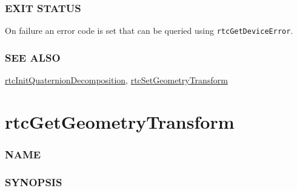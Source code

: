 \subsubsection{EXIT STATUS}\label{exit-status}

On failure an error code is set that can be queried using
\texttt{rtcGetDeviceError}.

\subsubsection{SEE ALSO}\label{see-also}

\hyperref[rtcinitquaterniondecomposition]{rtcInitQuaternionDecomposition},
\hyperref[rtcsetgeometrytransform]{rtcSetGeometryTransform}

\pagebreak

\section{rtcGetGeometryTransform}\label{rtcgetgeometrytransform}

\subsubsection{NAME}\label{name}

\begin{Shaded}
\begin{Highlighting}[]
\OperatorTok{{-}}
\end{Highlighting}
\end{Shaded}

\subsubsection{SYNOPSIS}\label{synopsis}

\begin{Shaded}
\begin{Highlighting}[]

\OperatorTok{(}
\OperatorTok{,}
  \OperatorTok{,}
  \OperatorTok{,}
  \OperatorTok{*}
\OperatorTok{);}
\end{Highlighting}
\end{Shaded}

